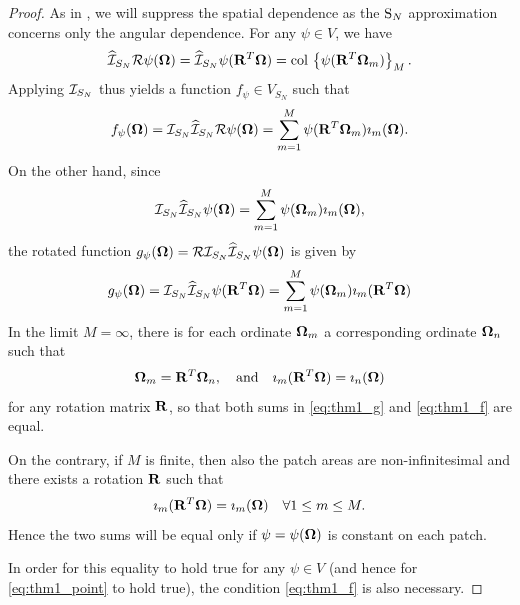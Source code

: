 {\begin{proof}
As in , we will suppress the spatial dependence as the $\text{S}_{N}$ approximation concerns only the angular
dependence. For any $\psi\in V$, we have
\begin{equation*}
	\widehat{{\mathcal{I}}}_{S_N} \mathcal{R}\psi(\mathbf{\Omega}) = \widehat{{\mathcal{I}}}_{S_N} \psi(\mathbf{R}^T\mathbf{\Omega}) =
	\operatorname{col\,}\left\{\psi(\mathbf{R}^T\mathbf{\Omega}_m)\right\}_{M}.
\end{equation*}
Applying ${\mathcal{I}}_{S_N}$ thus yields a function $f_\psi \in V_{S_N}$ such that
\begin{equation}\label{eq:thm1_f}
f_\psi(\mathbf{\Omega}) = {\mathcal{I}}_{S_N}\widehat{{\mathcal{I}}}_{S_N} \mathcal{R}\psi(\mathbf{\Omega}) = \sum_{m=1}^M 
\psi(\mathbf{R}^T\mathbf{\Omega}_m)\imath_m(\mathbf{\Omega}).
\end{equation}
On the other hand, since 
$$
	{\mathcal{I}}_{S_N}\widehat{{\mathcal{I}}}_{S_N}\psi(\mathbf{\Omega}) = \sum_{m=1}^M 
\psi(\mathbf{\Omega}_m)\imath_m(\mathbf{\Omega}),
$$
the rotated function $g_\psi(\mathbf{\Omega}) = \mathcal{R}{\mathcal{I}}_{S_N}\widehat{{\mathcal{I}}}_{S_N}\psi(\mathbf{\Omega})$ is given by
\begin{equation}\label{eq:thm1_g}
g_\psi(\mathbf{\Omega}) = {\mathcal{I}}_{S_N}\widehat{{\mathcal{I}}}_{S_N}\psi(\mathbf{R}^T\mathbf{\Omega}) = \sum_{m=1}^M \psi(\mathbf{\Omega}_m)\imath_m(\mathbf{R}^T\mathbf{\Omega})
\end{equation}
In the limit $M = \infty$, there is for each ordinate $\mathbf{\Omega}_m$ a corresponding ordinate $\mathbf{\Omega}_n$ such that
$$
	\mathbf{\Omega}_m = \mathbf{R}^T \mathbf{\Omega}_n,\quad \mbox{and}\quad \imath_m(\mathbf{R}^T\mathbf{\Omega}) = \imath_n(\mathbf{\Omega})
$$ 
for any rotation matrix $\mathbf{R}$, so that both sums in \eqref{eq:thm1_g} and \eqref{eq:thm1_f} are equal.

On the contrary, if $M$ is finite, then also the patch areas are non-infinitesimal and there exists a rotation
$\mathbf{R}$ such that 
$$
	\imath_m(\mathbf{R}^T\mathbf{\Omega}) = \imath_m(\mathbf{\Omega})\quad \forall 1 \leq m \leq M.
$$
Hence the two sums will be equal only if $\psi = \psi(\mathbf{\Omega})$ is constant on each patch.

In order for this equality to hold true for any $\psi \in V$ (and hence for \eqref{eq:thm1_point} to hold true), the
condition \eqref{eq:thm1_f} is also necessary.
\end{proof}

}



